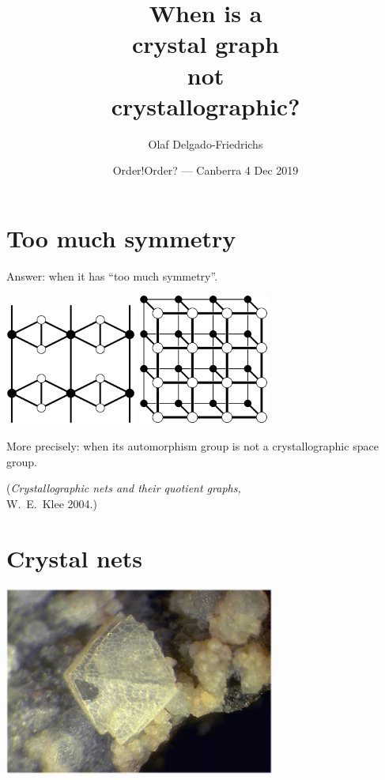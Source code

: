 \documentclass{beamer}
\title{When is a\\ crystal graph\\ not\\ crystallographic?}
\author[Olaf Delgado]{Olaf Delgado-Friedrichs}
\date{Order!Order? --- Canberra 4 Dec 2019}
\begin{document}
\begin{frame}
  \titlepage
\end{frame}


\section{Too much symmetry}

\begin{frame}
  \begin{center}
    Answer: when it has ``too much symmetry''.

    \includegraphics[width=1.7in]{unstable}
    \qquad
    \includegraphics[width=1.7in]{ladder}

    More precisely: when its automorphism group is not a crystallographic
    space group.

    ({\em Crystallographic nets and their quotient graphs,}\\
    W.\ E.\ Klee 2004.)
  \end{center}
\end{frame}


\section{Crystal nets}

\begin{frame}
  \begin{center}
    \includegraphics[width=3.5in]{fau-photo}
  \end{center}
\end{frame}
\end{document}
